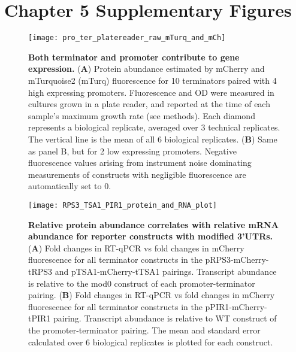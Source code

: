 \documentclass[../main.tex]{subfiles}
\begin{document}
\newpage
\FloatBarrier
\section{Chapter 5 Supplementary Figures}

\begin{figure}[bh!]
\texttt{[image: pro\_ter\_platereader\_raw\_mTurq\_and\_mCh]} \caption[Both terminator and promoter contribute to gene expression.]{\textbf{Both terminator and promoter contribute to gene expression.} (\textbf{A}) Protein abundance estimated by mCherry and mTurquoise2 (mTurq) fluorescence for 10 terminators paired with 4 high expressing promoters. Fluorescence and OD were measured in cultures grown in a plate reader, and reported at the time of each sample's maximum growth rate (see methods). Each diamond represents a biological replicate, averaged over 3 technical replicates.  The vertical line is the mean of all 6 biological replicates. (\textbf{B}) Same as panel B, but for 2 low expressing promoters. Negative fluorescence values arising from instrument noise dominating measurements of constructs with negligible fluorescence are automatically set to 0.}\label{fig:raw-pro-ter-swap-protein-fluo}
\end{figure}

\begin{figure}[ph!]

{\centering \texttt{[image: RPS3\_TSA1\_PIR1\_protein\_and\_RNA\_plot]} 

}

\caption[Relative protein abundance correlates with relative mRNA abundance for reporter constructs with modified 3'UTRs.]{\textbf{Relative protein abundance correlates with relative mRNA abundance for reporter constructs with modified 3'UTRs.} (\textbf{A}) Fold changes in RT-qPCR vs fold changes in mCherry fluorescence for all terminator constructs in the pRPS3-mCherry-tRPS3 and pTSA1-mCherry-tTSA1 pairings. Transcript abundance is relative to the mod0 construct of each promoter-terminator pairing. (\textbf{B}) Fold changes in RT-qPCR vs fold changes in mCherry fluorescence for all terminator constructs in the pPIR1-mCherry-tPIR1 pairing. Transcript abundance is relative to WT construct of the promoter-terminator pairing. The mean and standard error calculated over 6 biological replicates is plotted for each construct.}\label{fig:protein-vs-RNA-plot-motifs}
\end{figure}
\end{document}
